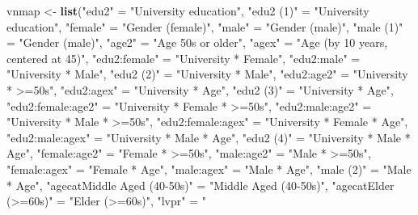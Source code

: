 \documentclass[
]{article}
\newenvironment{Shaded}{\begin{snugshade}}{\end{snugshade}}
\newcommand{\KeywordTok}[1]{\textcolor[rgb]{0.13,0.29,0.53}{\textbf{#1}}}
\newcommand{\NormalTok}[1]{#1}
\newcommand{\StringTok}[1]{\textcolor[rgb]{0.31,0.60,0.02}{#1}}
\begin{document}
\begin{Shaded}
\begin{Highlighting}[]
\NormalTok{vnmap <-}\StringTok{ }\KeywordTok{list}\NormalTok{(}\StringTok{"edu2"}\NormalTok{ =}\StringTok{ "University education"}\NormalTok{,}
              \StringTok{"edu2 (1)"}\NormalTok{ =}\StringTok{ "University education"}\NormalTok{,}
              \StringTok{"female"}\NormalTok{ =}\StringTok{ "Gender (female)"}\NormalTok{,}
              \StringTok{"male"}\NormalTok{ =}\StringTok{ "Gender (male)"}\NormalTok{,}
              \StringTok{"male (1)"}\NormalTok{ =}\StringTok{ "Gender (male)"}\NormalTok{,}
              \StringTok{"age2"}\NormalTok{ =}\StringTok{ "Age 50s or older"}\NormalTok{,}
              \StringTok{"agex"}\NormalTok{ =}\StringTok{ "Age (by 10 years, centered at 45)"}\NormalTok{,}
              \StringTok{"edu2:female"}\NormalTok{ =}\StringTok{ "University * Female"}\NormalTok{,}
              \StringTok{"edu2:male"}\NormalTok{ =}\StringTok{ "University * Male"}\NormalTok{,}
              \StringTok{"edu2 (2)"}\NormalTok{ =}\StringTok{ "University * Male"}\NormalTok{,}
              \StringTok{"edu2:age2"}\NormalTok{ =}\StringTok{ "University * >=50s"}\NormalTok{,}
              \StringTok{"edu2:agex"}\NormalTok{ =}\StringTok{ "University * Age"}\NormalTok{,}
              \StringTok{"edu2 (3)"}\NormalTok{ =}\StringTok{ "University * Age"}\NormalTok{,}
              \StringTok{"edu2:female:age2"}\NormalTok{ =}\StringTok{ "University * Female * >=50s"}\NormalTok{,}
              \StringTok{"edu2:male:age2"}\NormalTok{ =}\StringTok{ "University * Male * >=50s"}\NormalTok{,}
              \StringTok{"edu2:female:agex"}\NormalTok{ =}\StringTok{ "University * Female * Age"}\NormalTok{,}
              \StringTok{"edu2:male:agex"}\NormalTok{ =}\StringTok{ "University * Male * Age"}\NormalTok{,}
              \StringTok{"edu2 (4)"}\NormalTok{ =}\StringTok{ "University * Male * Age"}\NormalTok{,}
              \StringTok{"female:age2"}\NormalTok{ =}\StringTok{ "Female * >=50s"}\NormalTok{,}
              \StringTok{"male:age2"}\NormalTok{ =}\StringTok{ "Male * >=50s"}\NormalTok{,}
              \StringTok{"female:agex"}\NormalTok{ =}\StringTok{ "Female * Age"}\NormalTok{,}
              \StringTok{"male:agex"}\NormalTok{ =}\StringTok{ "Male * Age"}\NormalTok{,}
              \StringTok{"male (2)"}\NormalTok{ =}\StringTok{ "Male * Age"}\NormalTok{,}
              \StringTok{"agecatMiddle Aged (40-50s)"}\NormalTok{ =}\StringTok{ "Middle Aged (40-50s)"}\NormalTok{,}
              \StringTok{"agecatElder (>=60s)"}\NormalTok{ =}\StringTok{ "Elder (>=60s)"}\NormalTok{,}
              \StringTok{"lvpr"}\NormalTok{ =}\StringTok{ "% of Life Residing Locally (zip)"}\NormalTok{,}
}
\end{Highlighting}
\end{Shaded}
\end{document}
